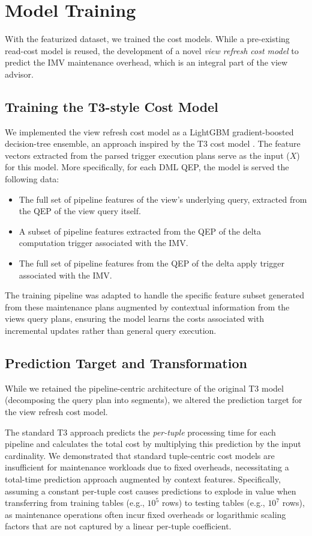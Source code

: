 \section{Model Training}
\label{sec:model_training}
With the featurized dataset, we trained the cost models. While a pre-existing read-cost model is reused, the development of a novel \emph{view refresh cost model} to predict the \ac{IMV} maintenance overhead, which is an integral part of the view advisor.

\subsection{Training the T3-style Cost Model}
\label{sec:t3_training}
We implemented the view refresh cost model as a LightGBM gradient-boosted decision-tree ensemble, an approach inspired by the \ac{T3} cost model \cite{rieger2025t3}.
The feature vectors extracted from the parsed trigger execution plans serve as the input ($X$) for this model. More specifically, for each \ac{DML} \ac{QEP}, the model is served the following data:
\begin{itemize}
    \item The full set of pipeline features of the view's underlying query, extracted from the \ac{QEP} of the view query itself.
    \item A subset of pipeline features extracted from the \ac{QEP} of the delta computation trigger associated with the \ac{IMV}.
    \item The full set of pipeline features from the \ac{QEP} of the delta apply trigger associated with the \ac{IMV}.
\end{itemize}

The training pipeline was adapted to handle the specific feature subset generated from these maintenance plans augmented by contextual information from the views query plans, ensuring the model learns the costs associated with incremental updates rather than general query execution.

\subsection{Prediction Target and Transformation}
\label{sec:prediction_target}

While we retained the pipeline-centric architecture of the original \ac{T3} model (decomposing the query plan into segments), we altered the prediction target for the view refresh cost model.

The standard \ac{T3} approach predicts the \textit{per-tuple} processing time for each pipeline and calculates the total cost by multiplying this prediction by the input cardinality. We demonstrated that standard tuple-centric cost models are insufficient for maintenance workloads due to fixed overheads, necessitating a total-time prediction approach augmented by context features. Specifically, assuming a constant per-tuple cost causes predictions to explode in value when transferring from training tables (e.g., $10^5$ rows) to testing tables (e.g., $10^7$ rows), as maintenance operations often incur fixed overheads or logarithmic scaling factors that are not captured by a linear per-tuple coefficient.

